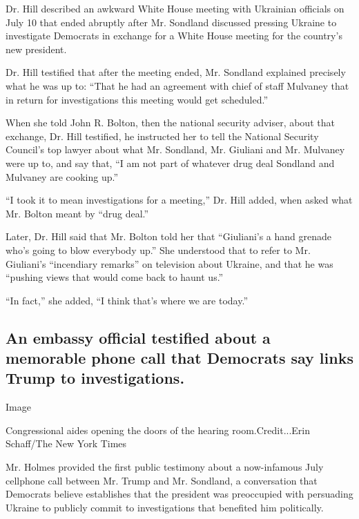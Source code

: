 Dr. Hill described an awkward White House meeting with Ukrainian
officials on July 10 that ended abruptly after Mr. Sondland discussed
pressing Ukraine to investigate Democrats in exchange for a White House
meeting for the country's new president.

Dr. Hill testified that after the meeting ended, Mr. Sondland explained
precisely what he was up to: ``That he had an agreement with chief of
staff Mulvaney that in return for investigations this meeting would get
scheduled.''

When she told John R. Bolton, then the national security adviser, about
that exchange, Dr. Hill testified, he instructed her to tell the
National Security Council's top lawyer about what Mr. Sondland, Mr.
Giuliani and Mr. Mulvaney were up to, and say that, ``I am not part of
whatever drug deal Sondland and Mulvaney are cooking up.''

``I took it to mean investigations for a meeting,'' Dr. Hill added, when
asked what Mr. Bolton meant by ``drug deal.''

Later, Dr. Hill said that Mr. Bolton told her that ``Giuliani's a hand
grenade who's going to blow everybody up.'' She understood that to refer
to Mr. Giuliani's ``incendiary remarks'' on television about Ukraine,
and that he was ``pushing views that would come back to haunt us.''

``In fact,'' she added, ``I think that's where we are today.''

\hypertarget{an-embassy-official-testified-about-a-memorable-phone-call-that-democrats-say-links-trump-to-investigations}{%
\subsection{An embassy official testified about a memorable phone call
that Democrats say links Trump to
investigations.}\label{an-embassy-official-testified-about-a-memorable-phone-call-that-democrats-say-links-trump-to-investigations}}

Image

Congressional aides opening the doors of the hearing room.Credit...Erin
Schaff/The New York Times

Mr. Holmes provided the first public testimony about a now-infamous July
cellphone call between Mr. Trump and Mr. Sondland, a conversation that
Democrats believe establishes that the president was preoccupied with
persuading Ukraine to publicly commit to investigations that benefited
him politically.

